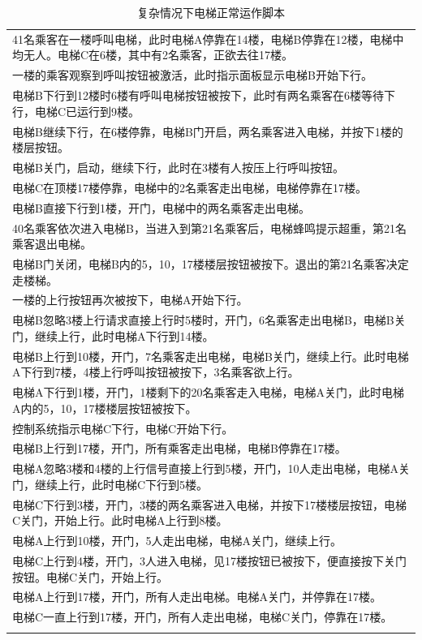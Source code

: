 \begin{center}
\begin{longtable}{p{}}
\caption{复杂情况下电梯正常运作脚本}\\
	\toprule
	41名乘客在一楼呼叫电梯，此时电梯A停靠在14楼，电梯B停靠在12楼，电梯中均无人。电梯C在6楼，其中有2名乘客，正欲去往17楼。\\ \cmidrule(lr){1-1}
	一楼的乘客观察到呼叫按钮被激活，此时指示面板显示电梯B开始下行。\\ \cmidrule(lr){1-1}
	电梯B下行到12楼时6楼有呼叫电梯按钮被按下，此时有两名乘客在6楼等待下行，电梯C已运行到9楼。\\ \cmidrule(lr){1-1}
	电梯B继续下行，在6楼停靠，电梯B门开启，两名乘客进入电梯，并按下1楼的楼层按钮。\\ \cmidrule(lr){1-1}
	电梯B关门，启动，继续下行，此时在3楼有人按压上行呼叫按钮。\\ \cmidrule(lr){1-1}
	电梯C在顶楼17楼停靠，电梯中的2名乘客走出电梯，电梯停靠在17楼。\\ \cmidrule(lr){1-1}
	电梯B直接下行到1楼，开门，电梯中的两名乘客走出电梯。\\ \cmidrule(lr){1-1}
	40名乘客依次进入电梯B，当进入到第21名乘客后，电梯蜂鸣提示超重，第21名乘客退出电梯。\\ \cmidrule(lr){1-1}
	电梯B门关闭，电梯B内的5，10，17楼楼层按钮被按下。退出的第21名乘客决定走楼梯。\\ \cmidrule(lr){1-1}
	一楼的上行按钮再次被按下，电梯A开始下行。\\ \cmidrule(lr){1-1}
	电梯B忽略3楼上行请求直接上行时5楼时，开门，6名乘客走出电梯B，电梯B关门，继续上行，此时电梯A下行到14楼。\\ \cmidrule(lr){1-1}
	电梯B上行到10楼，开门，7名乘客走出电梯，电梯B关门，继续上行。此时电梯A下行到7楼，4楼上行呼叫按钮被按下，3名乘客欲上行。\\ \cmidrule(lr){1-1}
	电梯A下行到1楼，开门，1楼剩下的20名乘客走入电梯，电梯A关门，此时电梯A内的5，10，17楼楼层按钮被按下。\\ \cmidrule(lr){1-1}
	控制系统指示电梯C下行，电梯C开始下行。\\ \cmidrule(lr){1-1}
	电梯B上行到17楼，开门，所有乘客走出电梯，电梯B停靠在17楼。\\ \cmidrule(lr){1-1}
	电梯A忽略3楼和4楼的上行信号直接上行到5楼，开门，10人走出电梯，电梯A关门，继续上行，此时电梯C下行到5楼。\\ \cmidrule(lr){1-1}
	电梯C下行到3楼，开门，3楼的两名乘客进入电梯，并按下17楼楼层按钮，电梯C关门，开始上行。此时电梯A上行到8楼。\\ \cmidrule(lr){1-1}
	电梯A上行到10楼，开门，5人走出电梯，电梯A关门，继续上行。\\ \cmidrule(lr){1-1}
	电梯C上行到4楼，开门，3人进入电梯，见17楼按钮已被按下，便直接按下关门按钮。电梯C关门，开始上行。\\ \cmidrule(lr){1-1}
	电梯A上行到17楼，开门，所有人走出电梯。电梯A关门，并停靠在17楼。\\ \cmidrule(lr){1-1}
	电梯C一直上行到17楼，开门，所有人走出电梯，电梯C关门，停靠在17楼。\\
	\bottomrule
\label{tab:normalFunction2}
\end{longtable}
\end{center}

